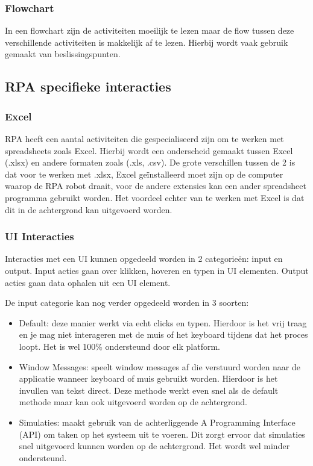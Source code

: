 \subsubsection{Flowchart}
In een flowchart zijn de activiteiten moeilijk te lezen maar de flow tussen deze verschillende activiteiten is makkelijk af te lezen. Hierbij wordt vaak gebruik gemaakt van beslissingspunten.

\subsection{RPA specifieke interacties}
\subsubsection{Excel}
RPA heeft een aantal activiteiten die gespecialiseerd zijn om te werken met spreadsheets zoals Excel. Hierbij wordt een onderscheid gemaakt tussen Excel (.xlsx) en andere formaten zoals (.xls, .csv). De grote verschillen tussen de 2 is dat voor te werken met .xlsx, Excel geïnstalleerd moet zijn op de computer waarop de RPA robot draait, voor de andere extensies kan een ander spreadsheet programma gebruikt worden. Het voordeel echter van te werken met Excel is dat dit in de achtergrond kan uitgevoerd worden.

\subsubsection{UI Interacties}
Interacties met een UI kunnen opgedeeld worden in 2 categorieën: input en output. Input acties gaan over klikken, hoveren en typen in UI elementen. Output acties gaan data ophalen uit een UI element.

De input categorie kan nog verder opgedeeld worden in 3 soorten:
\begin{itemize}
	\item Default: deze manier werkt via echt clicks en typen. Hierdoor is het vrij traag en je mag niet interageren met de muis of het keyboard tijdens dat het proces loopt. Het is wel 100\% ondersteund door elk platform. 
	\item Window Messages: speelt window messages af die verstuurd worden naar de applicatie wanneer keyboard of muis gebruikt worden. Hierdoor is het invullen van tekst direct. Deze methode werkt even snel als de default methode maar kan ook uitgevoerd worden op de achtergrond.
	\item Simulaties: maakt gebruik van de achterliggende A Programming Interface (API) om taken op het systeem uit te voeren. Dit zorgt ervoor dat simulaties snel uitgevoerd kunnen worden op de achtergrond. Het wordt wel minder ondersteund.
\end{itemize}

